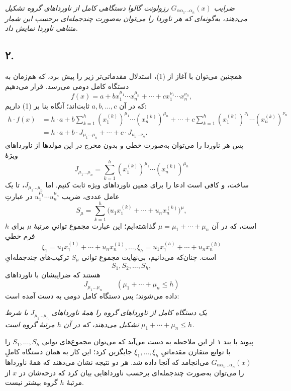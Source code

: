 \documentclass[11pt]{article}
\begin{document}
\emph{ضرایب $G_{\alpha\alpha_1\ldots\alpha_n}(x)$ رزولونت گالوا دستگاهی کامل از ناورداهای گروه تشکیل می‌دهند، به‌گونه‌ای که هر ناوردا را می‌توان به‌صورت چندجمله‌ای برحسب این شمار متناهی ناوردا نمایش داد.}

\subsection*{۲.}
همچنین می‌توان با آغاز از (1)، استدلال مقدماتی‌تر زیر را پیش برد، که هم‌زمان به دستگاه کامل دومی می‌رسد. قرار می‌دهیم
\[
  f(x)=a+b x_1^{\mu_1}\cdots x_n^{\mu_n}
       +\cdots+c x_1^{\nu_1}\cdots x_n^{\nu_n},
\]
که در آن $a,b,\ldots,c$ ثابت‌اند؛ آنگاه بنا بر (1) داریم:
\[
\begin{aligned}
 h\cdot f(x)
 &=h\cdot a+b\sum_{k=1}^{h}(x_1^{(k)})^{\mu_1}\cdots(x_n^{(k)})^{\mu_n}
     +\cdots
     +c\sum_{k=1}^{h}(x_1^{(k)})^{\nu_1}\cdots(x_n^{(k)})^{\nu_n} \\
 &=h\cdot a+b\cdot J_{\mu_1\ldots\mu_n}+\cdots+c\cdot J_{\nu_1\ldots\nu_n}.
\end{aligned}
\]
پس هر ناوردا را می‌توان به‌صورت خطی و بدون مخرج در این مولدها از ناورداهای ویژهٔ
\[
  J_{\mu_1\ldots\mu_n}
  =\sum_{k=1}^{h}(x_1^{(k)})^{\mu_1}\cdots(x_n^{(k)})^{\mu_n}
\]
ساخت، و کافی است ادعا را برای همین ناورداهای ویژه ثابت کنیم. اما $J_{\mu_1\ldots\mu_n}$، تا یک عامل عددی، ضریب $u_1^{\mu_1}\cdots u_n^{\mu_n}$ در عبارتِ
\[
  S_\mu=\sum_{k=1}^{h}
  \bigl(u_1x_1^{(k)}+\cdots+u_nx_n^{(k)}\bigr)^{\mu},
\]
است، که در آن $\mu=\mu_1+\cdots+\mu_n$ گذاشته‌ایم؛ این عبارت مجموع توانیِ مرتبهٔ $\mu$ برای $h$ فرم خطیِ
\[
  \xi_1=u_1x_1^{(1)}+\cdots+u_nx_n^{(1)},\ldots,
  \xi_h=u_1x_1^{(h)}+\cdots+u_nx_n^{(h)}
\]
است. چنان‌که می‌دانیم، بی‌نهایت مجموع توانی $S_\mu$ ترکیب‌های چندجمله‌ایِ
\[
  S_1,S_2,\ldots,S_h,
\]
هستند که ضرایبشان با ناورداهای
\[
  J_{\mu_1\ldots\mu_n}\qquad(\mu_1+\cdots+\mu_n\le h)
\]
داده می‌شوند؛ پس دستگاه کامل دومی به دست آمده است:

\emph{یک دستگاه کامل از ناورداهای گروه را همهٔ ناورداهای $J_{\mu_1\ldots\mu_n}$ با شرط $\mu_1+\cdots+\mu_n\le h$ تشکیل می‌دهند، که در آن $h$ مرتبهٔ گروه است.}

پیوند با بند ۱ از این ملاحظه به دست می‌آید که می‌توان مجموع‌های توانی $S_1,\ldots,S_h$ را با توابع متقارن مقدماتیِ $\xi_1,\ldots,\xi_h$ جایگزین کرد؛ این کار به همان دستگاه کاملِ $G_{\alpha\alpha_1\ldots\alpha_n}(x)$ می‌انجامد که آنجا داده شد. هر دو نتیجه نشان می‌دهند که همهٔ ناورداها را می‌توان به‌صورت چندجمله‌ای برحسب ناورداهایی بیان کرد که درجه‌شان در $x$ از مرتبهٔ $h$ گروه بیشتر نیست.
\end{document}
